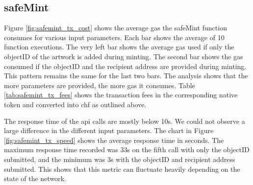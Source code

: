 \subsection*{safeMint}
Figure \ref{fig:safemint_tx_cost} shows the average gas the safeMint function consumes for various input parameters. Each bar shows the average of 10 function executions. The very left bar shows the average gas used if only the objectID of the artwork is added during minting. The second bar shows the gas consumed if the objectID and the recipient address are provided during minting. This pattern remains the same for the last two bars. The analysis shows that the more parameters are provided, the more gas it consumes. Table \ref{tab:safemint_tx_fees} shows the transaction fees in the corresponding native token and converted into \gls{chf} as outlined above. 

\begin{table}[h]
\caption{Estimated transaction fees safeMint}
\label{tab:safemint_tx_fees}
\end{table}

The response time of the \gls{api} calls are mostly below 10s. We could not observe a large difference in the different input parameters. The chart in Figure \ref{fig:safemint_tx_speed} shows the average response time in seconds. The maximum response time recorded was 33s on the fifth call with only the objectID submitted, and the minimum was 3s with the objectID and recipient address submitted. This shows that this metric can fluctuate heavily depending on the state of the network.

